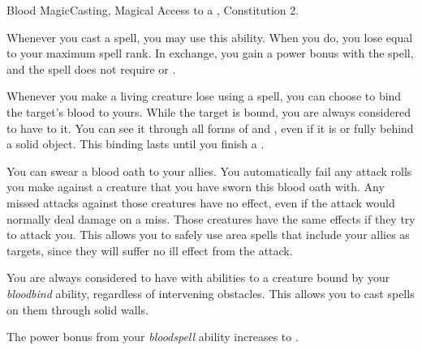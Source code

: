   \begin{magicalfeat}{Blood Magic}{Casting, Magical}
    \featpre Access to a , Constitution 2.

     Whenever you cast a spell, you may use this ability.
    When you do, you lose  equal to your maximum spell rank.
    In exchange, you gain a  power bonus with the spell, and the spell does not require  or .

     Whenever you make a living creature lose  using a spell, you can choose to bind the target's blood to yours.
    While the target is bound, you are always considered to have  to it.
    You can see it through all forms of  and , even if it is  or fully behind a solid object.
    This binding lasts until you finish a .

     You can swear a blood oath to your allies.
    You automatically fail any attack rolls you make against a creature that you have sworn this blood oath with.
    Any missed attacks against those creatures have no effect, even if the attack would normally deal damage on a miss.
    Those creatures have the same effects if they try to attack you.
    This allows you to safely use area spells that include your allies as targets, since they will suffer no ill effect from the attack.

     You are always considered to have  with \magical abilities to a creature bound by your \textit{bloodbind} ability, regardless of intervening obstacles.
    This allows you to cast spells on them through solid walls.

     The power bonus from your \textit{bloodspell} ability increases to .
  \end{magicalfeat}

